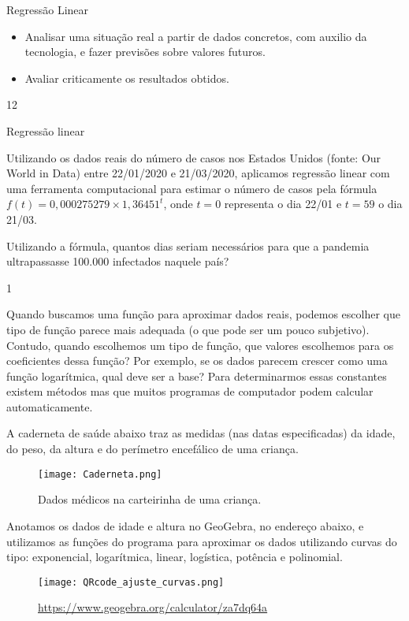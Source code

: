\begin{objectives}{Regressão Linear}
{
	\begin{itemize}
	\item Analisar uma situação real a partir de dados concretos, com auxilio da tecnologia, e fazer previsões sobre valores futuros.
	\item Avaliar criticamente os resultados obtidos.
	\end{itemize}
}{1}{2}
\end{objectives}
\begin{answer}{Regressão linear}
{
	Utilizando os dados reais do número de casos nos Estados Unidos (fonte: Our World in Data) entre 22/01/2020 e 21/03/2020, aplicamos regressão linear com uma ferramenta computacional para estimar o número de casos pela fórmula $f(t) = 0{,}000275279 \times 1{,}36451^t$, onde $t=0$ representa o dia 22/01 e $t= 59$ o dia 21/03. %

	Utilizando a fórmula, quantos dias seriam necessários para que a pandemia ultrapassasse 100.000 infectados naquele país?
}{1}
\end{answer}



Quando buscamos uma função para aproximar dados reais, podemos escolher que tipo de função parece mais adequada (o que pode ser um pouco subjetivo). Contudo, quando escolhemos um tipo de função, que valores escolhemos para os coeficientes dessa função? Por exemplo, se os dados parecem crescer como uma função logarítmica, qual deve ser a base? Para determinarmos essas constantes existem métodos mas que muitos programas de computador podem calcular automaticamente.

A caderneta de saúde abaixo traz as medidas (nas datas especificadas) da idade, do peso, da altura e do perímetro encefálico de uma criança.

\begin{figure}[H]
\centering

\texttt{[image: Caderneta.png]}
\caption{Dados médicos na carteirinha de uma criança.}
\end{figure}

Anotamos os dados de idade e altura no GeoGebra, no endereço abaixo, e utilizamos as funções do programa para aproximar os dados utilizando curvas do tipo: exponencial, logarítmica, linear, logística, potência e polinomial.

\begin{figure}[H]
\centering

\texttt{[image: QRcode\_ajuste\_curvas.png]}

\url{https://www.geogebra.org/calculator/za7dq64a}
\end{figure}

